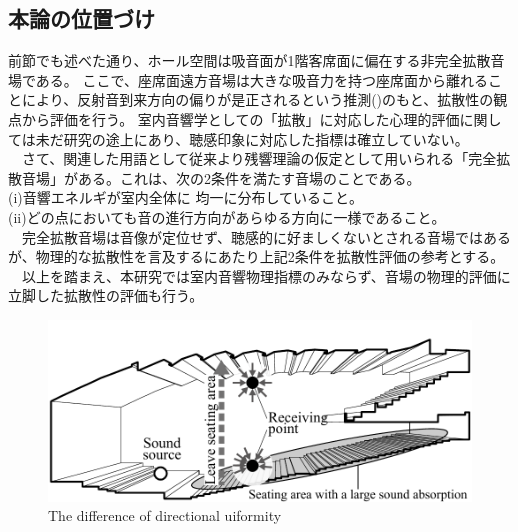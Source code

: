 

\addtocounter{footnote}{1}
\addtocounter{footnote}{1}
\addtocounter{footnote}{1}

\pagebreak
\subsection{本論の位置づけ}
前節でも述べた通り、ホール空間は吸音面が1階客席面に偏在する非完全拡散音場である。
ここで、座席面遠方音場は大きな吸音力を持つ座席面から離れることにより、反射音到来方向の偏りが是正されるという推測()のもと、拡散性の観点から評価を行う。
室内音響学としての「拡散」に対応した心理的評価に関しては未だ研究の途上にあり、聴感印象に対応した指標は確立していない。
\\　さて、関連した用語として従来より残響理論の仮定として用いられる「完全拡散音場」がある。これは、次の2条件を満たす音場のことである。
\\(i)音響エネルギが室内全体に 均一に分布していること。
\\(i\hspace{-.05em}i)どの点においても音の進行方向があらゆる方向に一様であること。
\\　完全拡散音場は音像が定位せず、聴感的に好ましくないとされる音場ではあるが、物理的な拡散性を言及するにあたり上記2条件を拡散性評価の参考とする。
\\　以上を踏まえ、本研究では室内音響物理指標のみならず、音場の物理的評価に立脚した拡散性の評価も行う。
\vspace{0.8cm}
\begin{figure}[htbp]
    \centering
    \includegraphics[keepaspectratio,scale=0.8]{01_att/far_improve.pdf}
    \caption{\hspace{1mm}The difference of directional uiformity}
    \label{fig:far_improve}
\end{figure}


